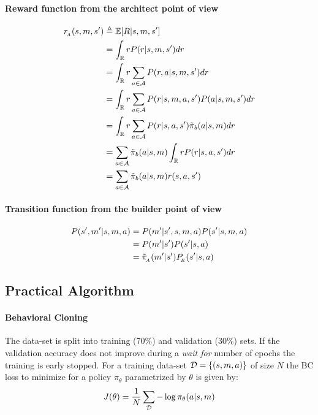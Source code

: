 \paragraph{Reward function from the architect point of view}
\begin{equation}
    \begin{split}
        r_{\!_A}(s,m,s') &\triangleq \mathbb{E}[R|s,m,s']\\
        &= \int_{\mathbb{R}}r P(r|s,m,s')dr \\
        &= \int_{\mathbb{R}} r\sum_{a\in{\mathcal{A}}}P(r,a|s,m,s')dr\\
        &= \int_{\mathbb{R}} r\sum_{a\in{\mathcal{A}}}P(r|s,m,a,s')P(a|s,m,s')dr\\
        &= \int_{\mathbb{R}} r\sum_{a\in{\mathcal{A}}}P(r|s,a,s')\tilde{\pi}_b(a|s,m)dr\\
        &= \sum_{a\in{\mathcal{A}}}\tilde{\pi}_b(a|s,m)\int_{\mathbb{R}}rP(r|s,a,s')dr\\
        &= \sum_{a\in{\mathcal{A}}}\tilde{\pi}_b(a|s,m)r(s,a,s')
    \end{split}
\end{equation}

\paragraph{Transition function from the builder point of view}
\begin{equation}
    \begin{split}
        P(s',m'|s,m,a) &= P(m'|s',s,m,a)P(s'|s,m,a)\\
        &= P(m'|s')P(s'|s,a)\\
        &= \tilde{\pi}_{\!_A}(m'|s') P_{\!_E}(s'|s,a)
    \end{split}
\end{equation}

\subsection{Practical Algorithm}
\label{ap:algo}


\paragraph{Behavioral Cloning } 
The data-set is split into training (70\%) and validation (30\%) sets. If the validation accuracy does not improve during a \emph{wait for} number of epochs the training is early stopped. For a training data-set ${\mathcal{D}} = \{(s,m,a)\}$ of size $N$ the BC loss to minimize for a policy $\pi_\theta$ parametrized by $\theta$ is given by: 
\begin{equation}
    J(\theta) = \frac{1}{N}\sum_{{\mathcal{D}}}-\log\pi_\theta(a|s,m) 
\end{equation}
